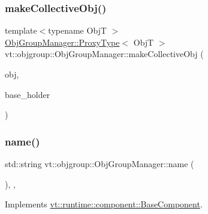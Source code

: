 \subsubsection{\texorpdfstring{make\+Collective\+Obj()}{makeCollectiveObj()}}
{\footnotesize\ttfamily template$<$typename ObjT $>$ \\
\hyperlink{structvt_1_1objgroup_1_1_obj_group_manager_aea65eef52f240a52210132eef5ce591f}{Obj\+Group\+Manager\+::\+Proxy\+Type}$<$ ObjT $>$ vt\+::objgroup\+::\+Obj\+Group\+Manager\+::make\+Collective\+Obj (\begin{DoxyParamCaption}\item[{ObjT $\ast$}]{obj,  }\item[{\hyperlink{structvt_1_1objgroup_1_1_obj_group_manager_ac1e9bb19d4a5923dd6d595bad28f04c9}{Holder\+Base\+Ptr\+Type}}]{base\+\_\+holder }\end{DoxyParamCaption})\hspace{0.3cm}{\ttfamily [private]}}

\mbox{\label{structvt_1_1objgroup_1_1_obj_group_manager_a92c0b07c2d90063c40087f625880cca3}} 
\subsubsection{\texorpdfstring{name()}{name()}}
{\footnotesize\ttfamily std\+::string vt\+::objgroup\+::\+Obj\+Group\+Manager\+::name (\begin{DoxyParamCaption}{ }\end{DoxyParamCaption})\hspace{0.3cm}{\ttfamily [inline]}, {\ttfamily [override]}, {\ttfamily [virtual]}}



Implements \hyperlink{structvt_1_1runtime_1_1component_1_1_base_component_a7701485f3539f78d42e6bad47fc7eb78}{vt\+::runtime\+::component\+::\+Base\+Component}.

\mbox{\label{structvt_1_1objgroup_1_1_obj_group_manager_a31f00bd509986001e3154af24239f24d}} 
